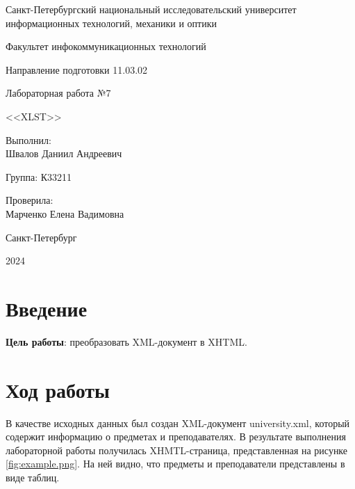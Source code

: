 \documentclass[a4paper, 14pt]{extarticle}
\begin{document}
\begin{titlepage}
  \vspace{0pt plus2fill}
  \noindent

  \vspace{0pt plus6fill}
  \begin{center}
    Санкт-Петербургский национальный исследовательский университет
    информационных технологий, механики и оптики

    \vspace{0pt plus3fill}

    Факультет инфокоммуникационных технологий

    Направление подготовки 11.03.02

    \vspace{0pt plus2fill}

    Лабораторная работа №7

    <<XLST>>

  \end{center}

  \vspace{0pt plus6fill}
  \begin{flushright}
    Выполнил: \\
    Швалов Даниил Андреевич

    Группа: К33211

    Проверила: \\
    Марченко Елена Вадимовна
  \end{flushright}

  \vspace{0pt plus5fill}
  \begin{center}
    Санкт-Петербург

    2024
  \end{center}
\end{titlepage}

\section{Введение}

\textbf{Цель работы}: преобразовать XML-документ в XHTML.

\section{Ход работы}

В качестве исходных данных был создан XML-документ
\foreignlanguage{english}{university.xml}, который содержит информацию о
предметах и преподавателях. В результате выполнения лабораторной работы
получилась XHMTL-страница, представленная на рисунке \ref{fig:example.png}. На
ней видно, что предметы и преподаватели представлены в виде таблиц.
\end{document}
